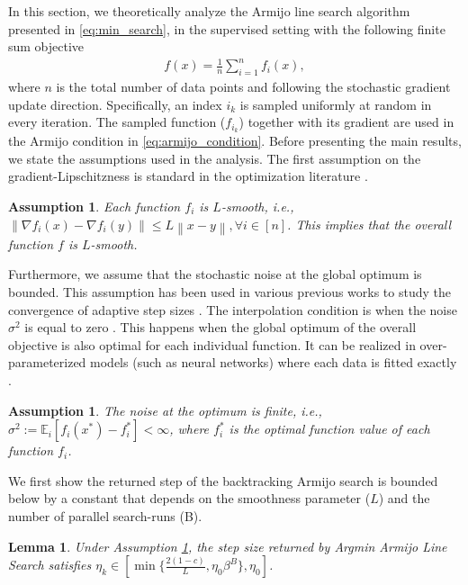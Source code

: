 \documentclass[10pt]{article} %
\newtheorem{lemma}[theorem]{Lemma}
\newtheorem{assumption}[theorem]{Assumption}
\newcommand{\EE}{\mathbb{E}}
\newcommand{\norm}[1]{\left \lVert #1 \right \rVert}
\begin{document}
In this section, we theoretically analyze the Armijo line search algorithm presented in \eqref{eq:min_search}, in the supervised setting with the following finite sum objective  
\begin{align*}
    f(x) = \tfrac{1}{n} \sum_{i=1}^n f_i(x),
\end{align*}
where $n$ is the total number of data points and following the stochastic gradient update direction.
Specifically, an index $i_k$ is sampled uniformly at random in every iteration. The sampled function ($f_{i_k}$) together with its gradient are used in the Armijo condition in \eqref{eq:armijo_condition}. Before presenting the main results, we state the assumptions used in the analysis. The first assumption on the gradient-Lipschitzness is standard in the optimization literature \citep{bottou2018optimization,vaswani2019painless,loizou2021stochastic,galli2023monotone}.  
\begin{assumption} \label{ass:smooth} Each function $f_i$ is $L$-smooth, i.e., $\norm{\nabla f_i(x) - \nabla f_i(y)} \leq L \norm{x - y}, \forall i \in [n]$. This implies that the overall function $f$ is $L$-smooth. 
\end{assumption}
Furthermore, we assume that the stochastic noise at the global optimum is bounded. This assumption has been used in various previous works to study the convergence of adaptive step sizes \citep{loizou2021stochastic,galli2023monotone,jiang2023adaptive}. The interpolation condition is when the noise $\sigma^2$ is equal to zero \citep{loizou2021stochastic}. This happens when the global optimum of the overall objective is also optimal for each individual function. It can be realized in   over-parameterized models (such as neural networks) where each data is fitted exactly \citep{vaswani2019painless,liu2018accelerating,bassily2018exponential}.
\begin{assumption} \label{ass:noise} The noise at the optimum is finite, i.e., $\sigma^2 := \EE_{i}[f_i(x^*) - f_i^*] < \infty$, where $f_i^*$ is the optimal function value of each function $f_i$.    
\end{assumption}

We first show the returned step of the backtracking Armijo search is bounded below by a constant that depends on the smoothness parameter ($L$) and the number of parallel search-runs (B).  
\begin{lemma} \label{lem:step_lower} Under Assumption \ref{ass:smooth}, the step size returned by \textit{Argmin Armijo Line Search} satisfies $\eta_k \in \left[ \min\{ \frac{2(1-c)}{L}, \eta_0 \beta^B\},  \eta_0 \right]$.  
\end{lemma}
\end{document}
